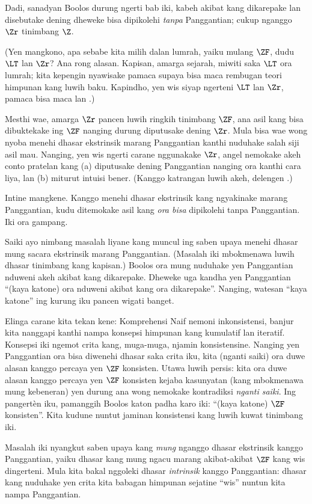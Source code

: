 \documentclass[../../../include/open-logic-section]{subfiles}
\begin{document}
Dadi, sanadyan Boolos durung ngerti bab iki,
kabeh akibat kang dikarepake lan disebutake
dening dheweke bisa dipikolehi \emph{tanpa}
Panggantian; cukup nganggo $\Zr$ tinimbang $\Z$.

(Yen mangkono, apa sebabe kita milih dalan
lumrah, yaiku mulang $\ZF$, dudu $\LT$ lan
$\Zr$? Ana rong alasan. Kapisan, amarga
sejarah, miwiti saka $\LT$ ora lumrah; kita
kepengin nyawisake pamaca supaya bisa maca
rembugan teori himpunan kang luwih baku.
Kapindho, yen wis siyap ngerteni $\LT$ lan
$\Zr$, pamaca bisa maca \citealt{Potter2004}
lan \citealt{ButtonLT1}.)

Mesthi wae, amarga $\Zr$ pancen luwih ringkih
tinimbang $\ZF$, ana asil kang bisa dibuktekake
ing $\ZF$ nanging durung diputusake dening
$\Zr$. Mula bisa wae wong nyoba menehi dhasar
ekstrinsik marang Panggantian kanthi nuduhake
salah siji asil mau. Nanging, yen wis ngerti
carane nggunakake $\Zr$, angel nemokake akeh
conto pratelan kang (a) diputusake dening
Panggantian nanging ora kanthi cara liya,
lan (b) miturut intuisi bener. (Kanggo katrangan
luwih akeh, delengen \citealt[\S13.2]{Potter2004}.)

Intine mangkene. Kanggo menehi dhasar
ekstrinsik kang ngyakinake marang Panggantian,
kudu ditemokake asil kang \emph{ora bisa}
dipikolehi tanpa Panggantian. Iki ora gampang.

Saiki ayo nimbang masalah liyane kang muncul
ing saben upaya menehi dhasar mung
sacara ekstrinsik marang Panggantian. (Masalah
iki mbokmenawa luwih dhasar tinimbang kang
kapisan.) Boolos ora mung nuduhake yen
Panggantian nduweni akeh akibat kang dikarepake.
Dheweke uga kandha yen Panggantian ``(kaya
katone) ora nduweni akibat kang ora dikarepake''.
Nanging, watesan ``kaya katone'' ing kurung iku
pancen wigati banget.

Elinga carane kita tekan kene: Komprehensi Naif
nemoni inkonsistensi, banjur kita nanggapi
kanthi nampa konsepsi himpunan kang kumulatif
lan iteratif. Konsepsi iki ngemot crita kang,
muga-muga, njamin konsistensine. Nanging yen
Panggantian ora bisa diwenehi dhasar saka crita
iku, kita (nganti saiki) ora duwe alasan
kanggo percaya yen $\ZF$ konsisten. Utawa luwih
persis: kita ora duwe alasan kanggo percaya
yen $\ZF$ konsisten kejaba kasunyatan (kang
mbokmenawa mung kebeneran) yen durung ana
wong nemokake kontradiksi \emph{nganti saiki}.
Ing pangertèn iku, pamanggih Boolos katon
padha karo iki: ``(kaya katone) $\ZF$
konsisten''. Kita kudune nuntut jaminan
konsistensi kang luwih kuwat tinimbang iki.

Masalah iki nyangkut saben upaya kang
\emph{mung} nganggo dhasar ekstrinsik kanggo
Panggantian, yaiku dhasar kang mung ngacu
marang akibat-akibat $\ZF$ kang wis dingerteni.
Mula kita bakal nggoleki dhasar
\emph{intrinsik} kanggo Panggantian: dhasar
kang nuduhake yen crita kita babagan himpunan
sejatine ``wis'' nuntun kita nampa Panggantian.
\end{document}
